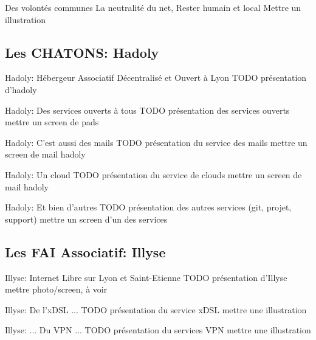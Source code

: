 \begin{frame}{Des volontés communes}
  La neutralité du net, Rester humain et local
  Mettre un illustration
\end{frame}

\subsection{Les CHATONS: Hadoly}

\begin{frame}{Hadoly: Hébergeur Associatif Décentralisé et Ouvert à Lyon}
  TODO présentation d'hadoly
\end{frame}

\begin{frame}{Hadoly: Des services ouverts à tous}
  TODO présentation des services ouverts
  mettre un screen de pads
\end{frame}

\begin{frame}{Hadoly: C'est aussi des mails}
  TODO présentation du service des mails
  mettre un screen de mail hadoly
\end{frame}

\begin{frame}{Hadoly: Un cloud}
  TODO présentation du service de clouds
  mettre un screen de mail hadoly
\end{frame}

\begin{frame}{Hadoly: Et bien d'autres}
  TODO présentation des autres services (git, projet, support)
  mettre un screen d'un des services
\end{frame}

\subsection{Les FAI Associatif: Illyse}

\begin{frame}{Illyse: Internet Libre sur Lyon et Saint-Etienne}
  TODO présentation d'Illyse
  mettre photo/screen, à voir
\end{frame}

\begin{frame}{Illyse: De l'xDSL ...}
  TODO présentation du service xDSL
  mettre une illustration
\end{frame}

\begin{frame}{Illyse: \hfill ... Du VPN ...\hfill}
  TODO présentation du services VPN
  mettre une illustration
\end{frame}

